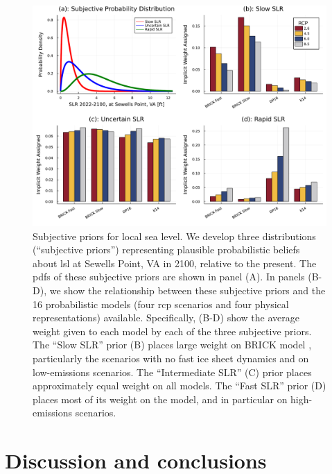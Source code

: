 \documentclass[12pt]{article}
\begin{document}
\begin{figure}
    \centering
    \includegraphics[width=\textwidth]{lsl-priors-weights}
    \caption{
        Subjective priors for local sea level.
        We develop three distributions (``subjective priors'') representing plausible probabilistic beliefs about \gls{lsl} at Sewells Point, VA in 2100, relative to the present.
        The \glspl{pdf} of these subjective priors are shown in panel (A).
        In panels (B-D), we show the relationship between these subjective priors and the 16 probabilistic models (four \gls{rcp} scenarios and four physical representations) available.
        Specifically, (B-D) show the average weight given to each model by each of the three subjective priors.
        The ``Slow SLR'' prior (B) places large weight on BRICK model \citep{wong_brick0.2:2017}, particularly the scenarios with no fast ice sheet dynamics and on low-emissions scenarios.
        The ``Intermediate SLR'' (C) prior places approximately equal weight on all models.
        The ``Fast SLR'' prior (D) places most of its weight on the \citet{deconto_antarctica:2016} model, and in particular on high-emissions scenarios.
    }\label{fig:lsl-priors-weights}
\end{figure}


\section{Discussion and conclusions}\label{sec:conclusions}
\end{document}
